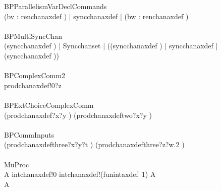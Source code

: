 \begin{circus}


 \circprocess BPParallelismVarDeclCommands \circdef \circbegin \\
    \circspot (\circvar bv : \nat \circspot renchanaxdef \then \Skip) \lpar | \lchanset syncchanaxdef \rchanset | \rpar (\circvar bw : \nat \circspot renchanaxdef \then \Skip) \\
 \circend \\

 \circprocess BPMultiSyncChan \circdef \circbegin \\
    \circspot (syncchanaxdef \then \Skip) \lpar | 
    Syncchanset
    | \rpar ((syncchanaxdef \then \Skip) \lpar | \lchanset syncchanaxdef \rchanset | \rpar (syncchanaxdef \then \Skip)) \\
 \circend \\

 \circprocess BPComplexComm2 \circdef \circbegin \\
    \circspot prodchanaxdef!0?z \then \Skip \\
\circend \\
 
 \circprocess BPExtChoiceComplexComm \circdef \circbegin \\
    \circspot (prodchanaxdef?x?y \then \Skip) \extchoice (prodchanaxdeftwo?x?y \then \Skip) \\
\circend \\

 \circprocess BPCommInputs \circdef \circbegin \\
   \circspot (prodchanaxdefthree?x?y?t \then \Skip) \extchoice (prodchanaxdefthree?z?w.2 \then \Skip) \\
 \circend \\

 \circprocess MuProc \circdef \circbegin \\
    A \circdef intchanaxdef!0 \then intchanaxdef!(funintaxdef~1) \then A \\
    \circspot A \\
 \circend \\


\end{circus}
